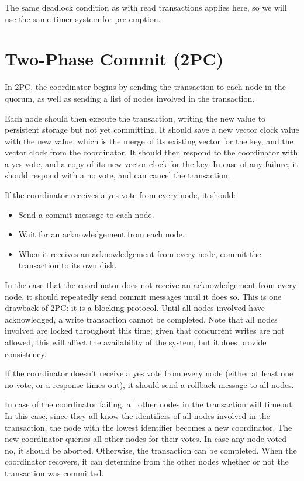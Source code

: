 \documentclass[12pt,a4paper,twoside,openright]{report}
\begin{document}
The same deadlock condition as with read transactions applies here, so we will use the same timer system for pre-emption.

\section{Two-Phase Commit (2PC)}

In 2PC, the coordinator begins by sending the transaction to each node in the quorum, as well as sending a list of nodes involved in the transaction.

Each node should then execute the transaction, writing the new value to persistent storage but not yet committing. It should save a new vector clock value with the new value, which is the merge of its existing vector for the key, and the vector clock from the coordinator. It should then respond to the coordinator with a yes vote, and a copy of its new vector clock for the key. In case of any failure, it should respond with a no vote, and can cancel the transaction.

If the coordinator receives a yes vote from every node, it should:

\begin{itemize}
\item
Send a commit message to each node.

\item
Wait for an acknowledgement from each node.

\item
When it receives an acknowledgement from every node, commit the transaction to its own disk.

\end{itemize}

In the case that the coordinator does not receive an acknowledgement from every node, it should repeatedly send commit messages until it does so. This is one drawback of 2PC: it is a blocking protocol. Until all nodes involved have acknowledged, a write transaction cannot be completed. Note that all nodes involved are locked throughout this time; given that concurrent writes are not allowed, this will affect the availability of the system, but it does provide consistency.

If the coordinator doesn't receive a yes vote from every node (either at least one no vote, or a response times out), it should send a rollback message to all nodes.

In case of the coordinator failing, all other nodes in the transaction will timeout. In this case, since they all know the identifiers of all nodes involved in the transaction, the node with the lowest identifier becomes a new coordinator. The new coordinator queries all other nodes for their votes. In case any node voted no, it should be aborted. Otherwise, the transaction can be completed. When the coordinator recovers, it can determine from the other nodes whether or not the transaction was committed.
\end{document}
